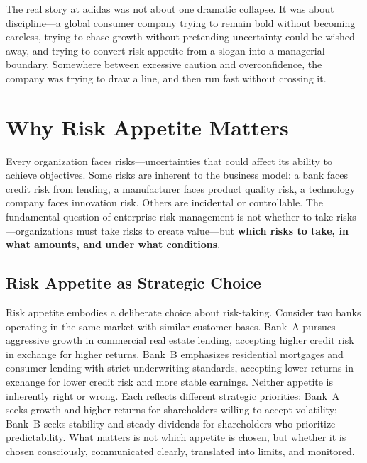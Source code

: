 \documentclass[11pt,openany]{book}
\begin{document}
\begin{corporateexample}
The real story at adidas was not about one dramatic collapse. It was about
discipline---a global consumer company trying to remain bold without becoming
careless, trying to chase growth without pretending uncertainty could be wished
away, and trying to convert risk appetite from a slogan into a managerial
boundary. Somewhere between excessive caution and overconfidence, the company
was trying to draw a line, and then run fast without crossing it.


\end{corporateexample}

\section{Why Risk Appetite Matters}
\label{sec:why-appetite-matters}

Every organization faces risks---uncertainties that could affect its ability to
achieve objectives. Some risks are inherent to the business model: a bank faces
credit risk from lending, a manufacturer faces product quality risk, a
technology company faces innovation risk. Others are incidental or controllable.
The fundamental question of enterprise risk management is not whether to take
risks---organizations must take risks to create value---but \textbf{which risks
to take, in what amounts, and under what conditions}.

\subsection{Risk Appetite as Strategic Choice}
\label{subsec:appetite-strategic-choice}

Risk appetite embodies a deliberate choice about risk-taking. Consider two banks
operating in the same market with similar customer bases. Bank~A pursues
aggressive growth in commercial real estate lending, accepting higher credit risk
in exchange for higher returns. Bank~B emphasizes residential mortgages and
consumer lending with strict underwriting standards, accepting lower returns in
exchange for lower credit risk and more stable earnings. Neither appetite is
inherently right or wrong. Each reflects different strategic priorities:
Bank~A seeks growth and higher returns for shareholders willing to accept
volatility; Bank~B seeks stability and steady dividends for shareholders who
prioritize predictability. What matters is not which appetite is chosen, but
whether it is chosen consciously, communicated clearly, translated into limits,
and monitored.
\end{document}
